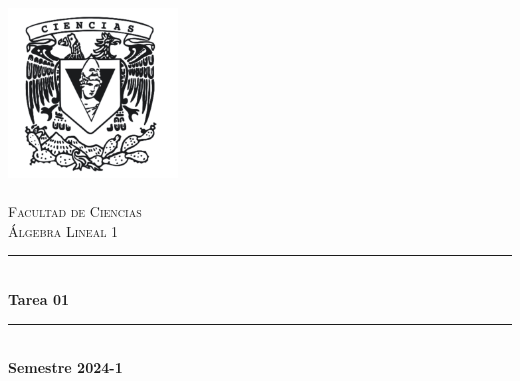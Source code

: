 \begin{titlepage}
\center %
\newcommand{\HRule}{\rule{\linewidth}{0.5mm}} 

\includegraphics[width=4.5cm]{IMA/Ciencias.png} \\ 
\quad \\[1.5cm]
\textsc{\Large Facultad de Ciencias}\\[0.5cm] %
\textsc{\Large Álgebra Lineal 1}\\[0.5cm] %
\makeatletter
    \HRule \\ [0.4cm]
        { \huge \bfseries Tarea 01}\\
    \HRule \\ [0.4cm]
\large\textbf{Semestre 2024-1}\\


\end{titlepage}
